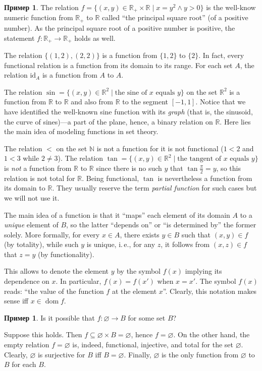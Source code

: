 \documentclass[12pt,notitlepage]{article}
\theoremstyle{plain}
\theoremstyle{definition}
\newtheorem{exm}[thm]{Пример}
\theoremstyle{plain}
\newcommand{\N}{\mathbb{N}}
\newcommand{\R}{\mathbb{R}}
\newcommand{\sbs}{\subseteq}
\newcommand{\void}{\varnothing}
\newcommand{\dom}{\mathop{\mathrm{dom}}}
\newcommand{\id}{\mathrm{id}}
\newcommand{\1}{\mathbf{1}}
\newcommand{\0}{\mathbf{0}}
\begin{document}
\begin{exm}
	The relation $f = \{(x,y) \in \R_+ \times \R \mid x = y^2 \wedge y > 0 \}$ is the well-know numeric function from $\R_+$ to $\R$ called ``the principal square root'' (of a positive number). As the principal square root of a positive number is positive, the statement $f\colon \R_+ \to \R_+$ holds as well.
	
	The relation $\{ (1,2), (2,2) \}$ is a function from $\{1, 2\}$ to $\{2\}$. In fact, every functional relation is a function from its domain to its range. For each set $A$, the relation $\id_A$ is a function from $A$ to $A$.
	
	The relation $\sin = \{ (x, y) \in \R^2 \mid \mbox{the sine of $x$ equals $y$} \}$ on the set $\R^2$ is a function from $\R$ to $\R$ and also from $\R$ to the segment $[-1, 1]$. Notice that we have identified the well-known sine function with its \emph{graph} (that is, the sinusoid, the curve of sines)---a part of the plane, hence, a binary relation on $\R$. Here lies the main idea of modeling functions in set theory.
	
	The relation $<$ on the set $\N$ is not a function for it is not functional ($1 < 2$ and $1 < 3$ while $2 \neq 3$). The relation $\tan = \{ (x, y) \in \R^2 \mid \mbox{the tangent of $x$ equals $y$} \}$ is \emph{not} a function from $\R$ to $\R$ since there is no such $y$ that $\tan \frac{\pi}{2} = y$, so this relation is not total for $\R$. Being functional, $\tan$ is nevertheless a function from its domain to $\R$. They usually reserve the term \emph{partial function} for such cases but we will not use it.
\end{exm}

The main idea of a function is that it ``maps'' each element of its domain $A$ to a \emph{unique} element of $B$, so the latter ``depends on'' or ``is determined by'' the former solely. More formally, for every $x \in A$, there exists $y \in B$ such that $(x,y) \in f$ (by totality), while such $y$ is unique, i.\,e., for any $z$, it follows from $(x,z) \in f$ that $z = y$ (by functionality).

This allows to denote the element $y$ by the symbol $f(x)$ implying its dependence on $x$. In particular, $f(x) = f(x')$ when $x = x'$. The symbol $f(x)$ reads: ``the value of the function $f$ at the element $x$''. Clearly, this notation makes sense iff $x \in \dom f$.


\begin{exm}\label{ch0:void_fnc}
	Is it possible that $f\colon \void \to B$ for some set $B$?
	
	Suppose this holds. Then $f \sbs \void \times B = \void$, hence $f = \void$. On the other hand, the empty relation $f = \void$ is, indeed, functional, injective, and total for the set $\void$. Clearly, $\void$ is surjective for $B$ iff $B = \void$. Finally, $\void$ is the only function from $\void$ to $B$ for each $B$.
\end{exm}
\end{document}
